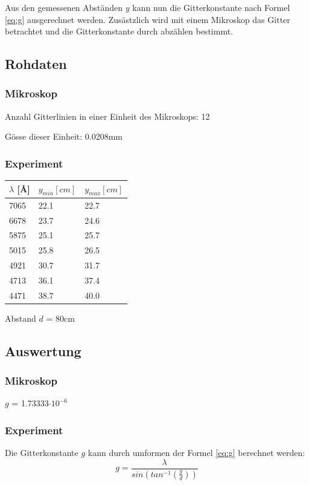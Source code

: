 \documentclass[12pt,a4paper]{article}
\begin{document}
Aus den gemessenen Abst\"anden $y$ kann nun die Gitterkonstante nach Formel \ref{eq:g} ausgerechnet werden. Zus\"astzlich wird mit einem Mikroskop das Gitter betrachtet und die Gitterkonstante durch abz\"ahlen bestimmt.

\subsection*{Rohdaten}
\subsubsection*{Mikroskop}
Anzahl Gitterlinien in einer Einheit des Mikroskops: 12

G\"osse dieser Einheit: 0.0208mm

\subsubsection*{Experiment}
\begin{tabular}{|l|l|l|}
\hline
$\lambda$ [\AA]&$y_{min} [cm]$&$y_{max} [cm]$\\
\hline
7065&22.1&22.7\\
6678&23.7&24.6\\
5875&25.1&25.7\\
5015&25.8&26.5\\
4921&30.7&31.7\\
4713&36.1&37.4\\
4471&38.7&40.0\\
\hline
\end{tabular}\vspace{10pt}

Abstand $d$ = 80cm

\subsection*{Auswertung}
\subsubsection*{Mikroskop}
$g$ = 1.73333$\cdot 10^{-6}$

\subsubsection*{Experiment}
Die Gitterkonstante $g$ kann durch umformen der Formel \ref{eq:g} berechnet werden:
\[ g = \frac{\lambda}{sin(tan^{-1}(\frac{y}{d}))} \]
\end{document}
